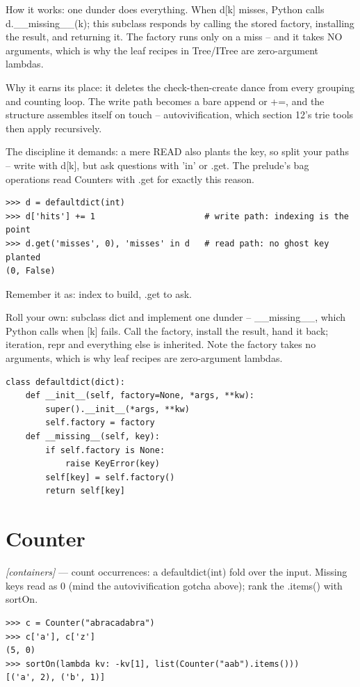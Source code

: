 \documentclass[11pt,letterpaper]{book}
\begin{document}
How it works: one dunder does everything. When d[k] misses, Python calls d.\_\_missing\_\_(k); this subclass responds by calling the stored factory, installing the result, and returning it. The factory runs only on a miss -- and it takes NO arguments, which is why the leaf recipes in Tree/ITree are zero-argument lambdas.


Why it earns its place: it deletes the check-then-create dance from every grouping and counting loop. The write path becomes a bare append or +=, and the structure assembles itself on touch -- autovivification, which section 12's trie tools then apply recursively.


The discipline it demands: a mere READ also plants the key, so split your paths -- write with d[k], but ask questions with 'in' or .get. The prelude's bag operations read Counters with .get for exactly this reason.

\begin{lstlisting}[style=spec]
>>> d = defaultdict(int)
>>> d['hits'] += 1                      # write path: indexing is the point
>>> d.get('misses', 0), 'misses' in d   # read path: no ghost key planted
(0, False)
\end{lstlisting}

Remember it as: index to build, .get to ask.


Roll your own: subclass dict and implement one dunder -- \_\_missing\_\_, which Python calls when [k] fails. Call the factory, install the result, hand it back; iteration, repr and everything else is inherited. Note the factory takes no arguments, which is why leaf recipes are zero-argument lambdas.

\begin{lstlisting}[style=code]
class defaultdict(dict):
    def __init__(self, factory=None, *args, **kw):
        super().__init__(*args, **kw)
        self.factory = factory
    def __missing__(self, key):
        if self.factory is None:
            raise KeyError(key)
        self[key] = self.factory()
        return self[key]
\end{lstlisting}

\section{Counter}
\noindent\textit{[containers]} --- count occurrences: a defaultdict(int) fold over the input. Missing keys read as 0 (mind the autovivification gotcha above); rank the .items() with sortOn.
\begin{lstlisting}[style=spec]
>>> c = Counter("abracadabra")
>>> c['a'], c['z']
(5, 0)
>>> sortOn(lambda kv: -kv[1], list(Counter("aab").items()))
[('a', 2), ('b', 1)]
\end{lstlisting}
\end{document}

